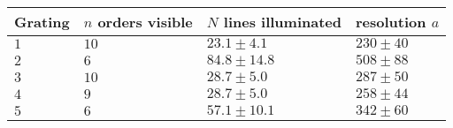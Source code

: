 	\begin{tabular}{|p{2cm}|p{3.82cm}|p{3.82cm}|p{3.82cm}|}
		\hline
		\rowcolor{tabcolor}
		Grating & $n$ orders visible & $N$ lines illuminated & resolution $a$ \\ \hline
		$1$  & $10$ & $23.1 \pm 4.1$ & $ 230 \pm 40 $ \\
		$2$  & $6$ & $84.8 \pm 14.8$ & $ 508 \pm 88 $ \\
		$3$  & $10$ & $28.7 \pm 5.0$ & $ 287 \pm 50 $ \\
		$4$  & $9$ & $28.7 \pm 5.0$ & $ 258 \pm 44 $ \\
		$5$  & $6$ & $57.1 \pm 10.1$ & $ 342 \pm 60 $ \\
		\hline
	\end{tabular}
